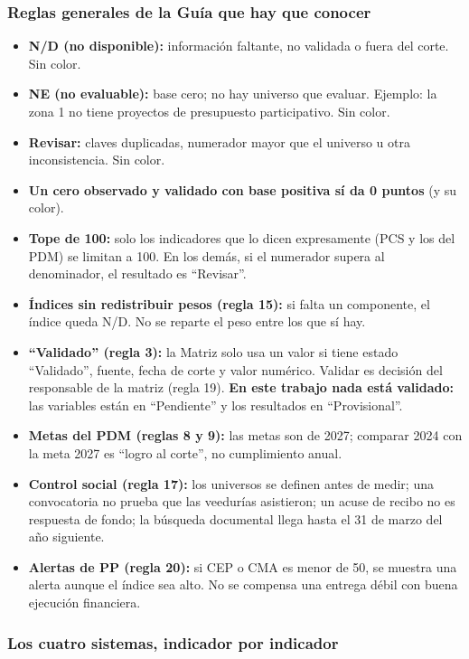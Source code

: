 \documentclass[11pt,letterpaper]{article}
\begin{document}
\subsubsection*{Reglas generales de la Guía que hay que conocer}

\begin{itemize}
\item \textbf{N/D (no disponible):} información faltante, no validada o fuera del corte. Sin color.
\item \textbf{NE (no evaluable):} base cero; no hay universo que evaluar. Ejemplo: la zona 1 no tiene proyectos de presupuesto participativo. Sin color.
\item \textbf{Revisar:} claves duplicadas, numerador mayor que el universo u otra inconsistencia. Sin color.
\item \textbf{Un cero observado y validado con base positiva sí da 0 puntos} (y su color).
\item \textbf{Tope de 100:} solo los indicadores que lo dicen expresamente (PCS y los del PDM) se limitan a 100. En los demás, si el numerador supera al denominador, el resultado es ``Revisar''.
\item \textbf{Índices sin redistribuir pesos (regla 15):} si falta un componente, el índice queda N/D. No se reparte el peso entre los que sí hay.
\item \textbf{``Validado'' (regla 3):} la Matriz solo usa un valor si tiene estado ``Validado'', fuente, fecha de corte y valor numérico. Validar es decisión del responsable de la matriz (regla 19). \textbf{En este trabajo nada está validado:} las variables están en ``Pendiente'' y los resultados en ``Provisional''.
\item \textbf{Metas del PDM (reglas 8 y 9):} las metas son de 2027; comparar 2024 con la meta 2027 es ``logro al corte'', no cumplimiento anual.
\item \textbf{Control social (regla 17):} los universos se definen antes de medir; una convocatoria no prueba que las veedurías asistieron; un acuse de recibo no es respuesta de fondo; la búsqueda documental llega hasta el 31 de marzo del año siguiente.
\item \textbf{Alertas de PP (regla 20):} si CEP o CMA es menor de 50, se muestra una alerta aunque el índice sea alto. No se compensa una entrega débil con buena ejecución financiera.
\end{itemize}

\subsubsection*{Los cuatro sistemas, indicador por indicador}
\end{document}
